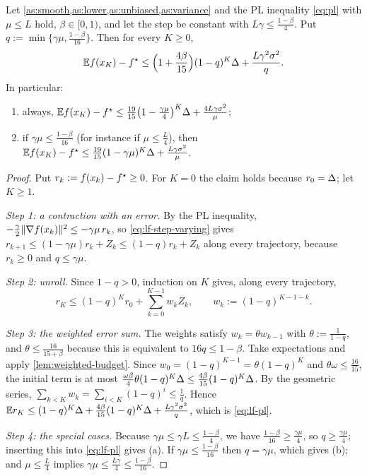 \begin{tcolorbox}[keybox]
\begin{theorem}\label{thm:lf-pl}
Let \cref{as:smooth,as:lower,as:unbiased,as:variance} and the PL inequality \eqref{eq:pl}
with $\mu\le L$ hold, $\beta\in[0,1)$, and let the step be constant with
$L\gamma\le\frac{1-\beta}{4}$. Put $q:=\min\bigl\{\gamma\mu,\frac{1-\beta}{16}\bigr\}$. Then for every
$K\ge0$,
\begin{equation}\label{eq:lf-pl}
  \mathbb{E} f(x_K)-f^\star\le\Bigl(1+\frac{4\beta}{15}\Bigr)(1-q)^K\Delta+\frac{L\gamma^2\sigma^2}{q} .
\end{equation}
In particular:
\begin{enumerate}[label=\textup{(\alph*)}]
\item always, $\mathbb{E} f(x_K)-f^\star\le\frac{19}{15}\bigl(1-\frac{\gamma\mu}{4}\bigr)^K\Delta+\frac{4L\gamma\sigma^2}{\mu}$;
\item if $\gamma\mu\le\frac{1-\beta}{16}$ (for instance if $\mu\le\frac L4$), then
  $\mathbb{E} f(x_K)-f^\star\le\frac{19}{15}(1-\gamma\mu)^K\Delta+\frac{L\gamma\sigma^2}{\mu}$.
\end{enumerate}
\end{theorem}
\end{tcolorbox}

\begin{proof}
Put $r_k:=f(x_k)-f^\star\ge0$. For $K=0$ the claim holds because $r_0=\Delta$; let $K\ge1$.

\emph{Step 1: a contraction with an error.} By the PL inequality,
$-\frac\gamma2\lVert \nabla f(x_k)\rVert^2\le-\gamma\mu\,r_k$, so \eqref{eq:lf-step-varying} gives
$r_{k+1}\le(1-\gamma\mu)r_k+Z_k\le(1-q)r_k+Z_k$ along every trajectory, because $r_k\ge0$ and
$q\le\gamma\mu$.

\emph{Step 2: unroll.} Since $1-q>0$, induction on $K$ gives, along every trajectory,
\[
  r_K\le(1-q)^Kr_0+\sum_{k=0}^{K-1}w_kZ_k,\qquad w_k:=(1-q)^{K-1-k}.
\]

\emph{Step 3: the weighted error sum.} The weights satisfy $w_k=\theta w_{k-1}$ with
$\theta:=\frac1{1-q}$, and $\theta\le\frac{16}{15+\beta}$ because this is equivalent to
$16q\le1-\beta$. Take expectations and apply \cref{lem:weighted-budget}. Since
$w_0=(1-q)^{K-1}=\theta(1-q)^K$ and $\theta\omega\le\frac{16}{15}$, the initial term is at most
$\frac{\omega\beta}{4}\theta(1-q)^K\Delta\le\frac{4\beta}{15}(1-q)^K\Delta$. By the geometric series,
$\sum_{k<K}w_k=\sum_{i<K}(1-q)^i\le\frac1q$. Hence
$\mathbb{E} r_K\le(1-q)^K\Delta+\frac{4\beta}{15}(1-q)^K\Delta+\frac{L\gamma^2\sigma^2}{q}$, which is
\eqref{eq:lf-pl}.

\emph{Step 4: the special cases.} Because $\gamma\mu\le\gamma L\le\frac{1-\beta}{4}$, we have
$\frac{1-\beta}{16}\ge\frac{\gamma\mu}{4}$, so $q\ge\frac{\gamma\mu}{4}$; inserting this into
\eqref{eq:lf-pl} gives (a). If $\gamma\mu\le\frac{1-\beta}{16}$ then $q=\gamma\mu$, which gives (b);
and $\mu\le\frac L4$ implies $\gamma\mu\le\frac{L\gamma}{4}\le\frac{1-\beta}{16}$.
\end{proof}


